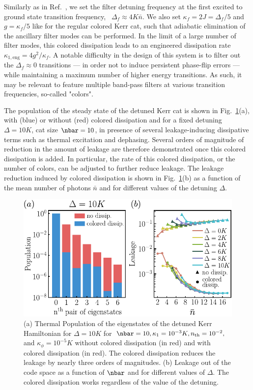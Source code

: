 Similarly as in Ref.~\cite{Putterman2022}, we set the filter detuning frequency at the first excited to ground state transition frequency, \ie~$\Delta_f \approx 4K \bar{n}$. We also set $\kappa_f = 2J = \Delta_f / 5$ and $g = \kappa_f / 5$ like for the regular colored Kerr cat, such that adiabatic elimination of the ancillary filter modes can be performed. In the limit of a large number of filter modes, this colored dissipation leads to an engineered dissipation rate $\kappa_{1,\textrm{eng}}=4g^2/\kappa_f$. A notable difficulty in the design of this system is to filter out the $\Delta_f \approx 0$ transitions --- in order not to induce persistent phase-flip errors --- while maintaining a maximum number of higher energy transitions. As such, it may be relevant to feature multiple band-pass filters at various transition frequencies, so-called "colors".

The population of the steady state of the detuned Kerr cat is shown in Fig.~\ref{fig:coloredthermalstate}(a), with (blue) or without (red) colored dissipation and for a fixed detuning $\Delta = 10K$, cat size $\nbar = 10$, in presence of several leakage-inducing dissipative terms such as thermal excitation and dephasing. Several orders of magnitude of reduction in the amount of leakage are therefore demonstrated once this colored dissipation is added. In particular, the rate of this colored dissipation, or the number of colors, can be adjusted to further reduce leakage. The leakage reduction induced by colored dissipation is shown in Fig.~\ref{fig:coloredthermalstate}(b) as a function of the mean number of photons $\bar{n}$ and for different values of the detuning $\Delta$.

\begin{figure}[t!]
    \includegraphics[width=\columnwidth]{file/image/Color_Thermal_State_V2.pdf}
    \caption{\label{fig:coloredthermalstate}
    (a) Thermal Population of the eigenstates of the detuned Kerr Hamiltonian for $\Delta = 10K$ for $\nbar = 10,\kappa_1 = 10^{-3}K, n_{\text{th}}=10^{-2},$ and $\kappa_\phi = 10^{-5}K$ without colored dissipation (in red) and with colored dissipation (in red). The colored dissipation reduces the leakage by nearly three orders of magnitudes. (b) Leakage out of the code space as a function of $\nbar$ and for different values of $\Delta$. The colored dissipation works regardless of the value of the detuning.
    }
\end{figure}


